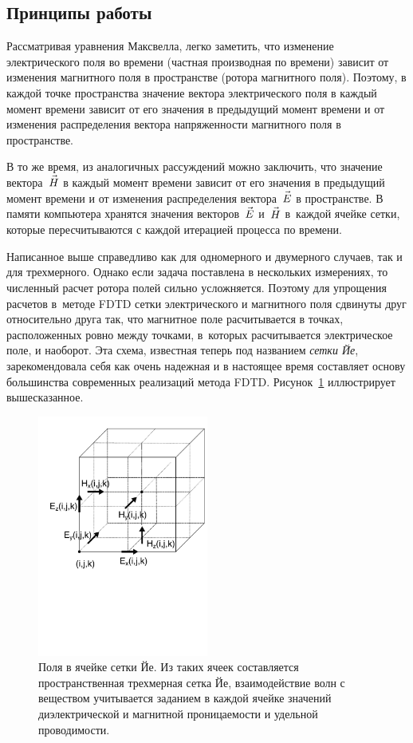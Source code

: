 \subsection{Принципы работы}

Рассматривая уравнения Максвелла, легко заметить, что изменение электрического
поля во времени (частная производная по времени) зависит от изменения магнитного
поля в пространстве (ротора магнитного поля). Поэтому, в каждой точке
пространства значение вектора электрического поля в каждый момент времени
зависит от его значения в предыдущий момент времени и от изменения распределения
вектора напряженности магнитного поля в пространстве.

В то же время, из аналогичных рассуждений можно заключить, что значение
вектора~$\vec{H\mathstrut}$ в каждый момент времени зависит от его значения в предыдущий
момент времени и от изменения распределения вектора~$\vec{E\mathstrut}$ в пространстве.
В памяти компьютера хранятся значения векторов~$\vec{E\mathstrut}$ и~$\vec{H\mathstrut}$
в~каждой ячейке сетки, которые пересчитываются с каждой итерацией процесса по времени.

Написанное выше справедливо как для одномерного и двумерного случаев, так и для
трехмерного. Однако если задача поставлена в нескольких измерениях, то численный
расчет ротора полей сильно усложняется. Поэтому для упрощения расчетов в~методе
FDTD сетки электрического и магнитного поля сдвинуты друг относительно друга
так, что магнитное поле расчитывается в точках, расположенных ровно между
точками, в~которых расчитывается электрическое поле, и наоборот. Эта схема,
известная теперь под названием \emph{сетки Йе}, зарекомендовала себя как очень
надежная и в настоящее время составляет основу большинства современных
реализаций метода FDTD. Рисунок~\ref{fig:YeeCell} иллюстрирует вышесказанное.

\begin{figure}[p]
\centering
\includegraphics[width=0.5\textwidth]{graphics/Yee-Cubes}
\caption{Поля в ячейке сетки Йе.
    Из таких ячеек составляется пространственная трехмерная сетка Йе, взаимодействие
    волн с веществом учитывается заданием в каждой ячейке значений диэлектрической
    и магнитной проницаемости и удельной проводимости.}
\label{fig:YeeCell}
\end{figure}

